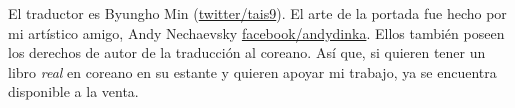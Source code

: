 El traductor es Byungho Min (\href{http://go.yurichev.com/17344}{twitter/tais9}).
El arte de la portada fue hecho por mi art\'istico amigo, Andy Nechaevsky
\href{http://go.yurichev.com/17023}{facebook/andydinka}.
Ellos tambi\'en poseen los derechos de autor de la traducci\'on al coreano.
As\'i que, si quieren tener un libro \emph{real} en coreano en su estante
y quieren apoyar mi trabajo, ya se encuentra disponible a la venta.


